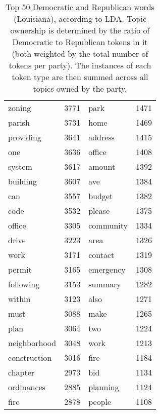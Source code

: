 \begin{table}[ht]
\begin{tabular}{lrlr}
  zoning & 3771 & park & 1471 \\ 
  parish & 3731 & home & 1469 \\ 
  providing & 3641 & address & 1415 \\ 
  one & 3636 & office & 1408 \\ 
  system & 3617 & amount & 1392 \\ 
  building & 3607 & ave & 1384 \\ 
  can & 3557 & budget & 1382 \\ 
  code & 3532 & please & 1375 \\ 
  office & 3305 & community & 1334 \\ 
  drive & 3223 & area & 1326 \\ 
  work & 3171 & contact & 1319 \\ 
  permit & 3165 & emergency & 1308 \\ 
  following & 3153 & summary & 1282 \\ 
  within & 3123 & also & 1271 \\ 
  must & 3088 & make & 1265 \\ 
  plan & 3064 & two & 1224 \\ 
  neighborhood & 3048 & work & 1213 \\ 
  construction & 3016 & fire & 1184 \\ 
  chapter & 2973 & bid & 1134 \\ 
  ordinances & 2885 & planning & 1124 \\ 
  fire & 2878 & people & 1108 \\ 
   \hline
\end{tabular}
\endgroup
\caption{Top 50 Democratic and Republican words (Louisiana), according to LDA. 
             Topic ownership is determined by the ratio of Democratic to Republican tokens in 
             it (both weighted by the total number of tokens per party). The instances of each 
             token type are then summed across all topics owned by the party.} 
\label{tabLDALA}
\end{table}

